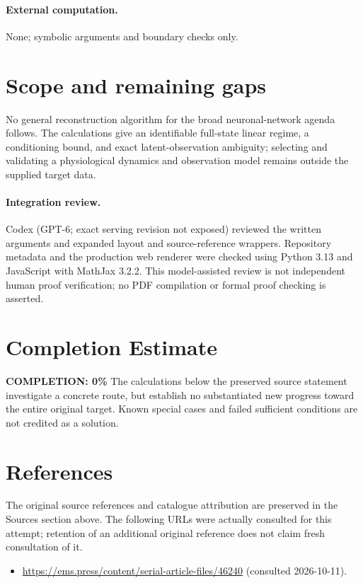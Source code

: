 \documentclass[11pt]{article}
\begin{document}
\paragraph{External computation.} None; symbolic arguments and boundary checks only.
\section{Scope and remaining gaps}
No general reconstruction algorithm for the broad neuronal-network agenda follows. The calculations give an identifiable full-state linear regime, a conditioning bound, and exact latent-observation ambiguity; selecting and validating a physiological dynamics and observation model remains outside the supplied target data.
\paragraph{Integration review.} Codex (GPT-6; exact serving revision not exposed) reviewed the written arguments and expanded layout and source-reference wrappers. Repository metadata and the production web renderer were checked using Python 3.13 and JavaScript with MathJax 3.2.2. This model-assisted review is not independent human proof verification; no PDF compilation or formal proof checking is asserted.

\section{Completion Estimate}
\noindent\textbf{COMPLETION: 0\%}
The calculations below the preserved source statement investigate a concrete route,
but establish no substantiated new progress toward the entire original target.
Known special cases and failed sufficient conditions are not credited as a solution.
\section{References}
The original source references and catalogue attribution are preserved in the
Sources section above. The following URLs were actually consulted for this attempt;
retention of an additional original reference does not claim fresh consultation of it.
\begin{itemize}
\item \url{https://ems.press/content/serial-article-files/46240} (consulted 2026-10-11). 
\end{itemize}
\end{document}
